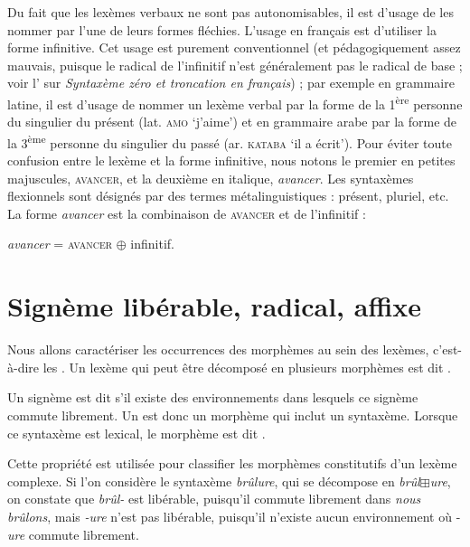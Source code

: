 Du fait que les lexèmes verbaux ne sont pas autonomisables, il est d’usage de les nommer par l’une de leurs formes fléchies. L’usage en français est d’utiliser la forme infinitive. Cet usage est purement conventionnel (et pédagogiquement assez mauvais, puisque le radical de l’infinitif n’est généralement pas le radical de base ; voir l’ sur \textit{Syntaxème zéro et troncation en français}) ; par exemple en grammaire latine, il est d’usage de nommer un lexème verbal par la forme de la 1\textsuperscript{ère} personne du singulier du présent (lat. \textsc{amo} ‘j’aime’) et en grammaire arabe par la forme de la 3\textsuperscript{ème} personne du singulier du passé (ar. \textsc{kataba} ‘il a écrit’). Pour éviter toute confusion entre le lexème et la forme infinitive, nous notons le premier en petites majuscules, \textsc{avancer}, et la deuxième en italique, \textit{avancer}. Les syntaxèmes flexionnels sont désignés par des termes métalinguistiques : présent, pluriel, etc. La forme \textit{avancer} est la combinaison de \textsc{avancer} et de l’infinitif :

\ea
\textit{avancer} = \textsc{avancer} ${\oplus}$ infinitif.
\z

\section{Signème libérable, radical, affixe}\label{sec:2.2.14}

Nous allons caractériser les occurrences des morphèmes au sein des lexèmes, c’est-à-dire les . Un lexème qui peut être décomposé en plusieurs morphèmes est dit .

{Un signème est dit  s’il existe des environnements dans lesquels ce signème commute librement. Un  est donc un morphème qui inclut un syntaxème. Lorsque ce syntaxème est lexical, le morphème est dit .}

Cette propriété est utilisée pour classifier les morphèmes constitutifs d’un lexème complexe. Si l’on considère le syntaxème \textit{brûlure}, qui se décompose en \textit{brûl}${\boxplus}$\textit{ure}, on constate que \textit{brûl-} est libérable, puisqu’il commute librement dans \textit{nous brûlons}, mais \textit{{}-ure} n’est pas libérable, puisqu’il n’existe aucun environnement où -\textit{ure} commute librement.


